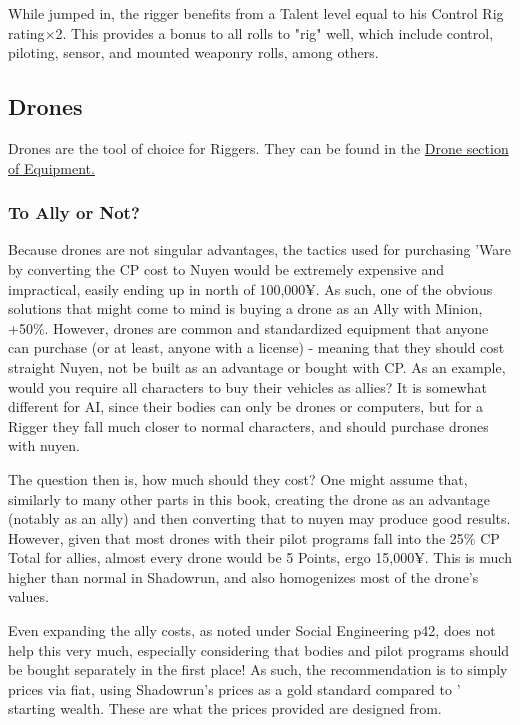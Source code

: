 \begin{multicols*}{3}
	While jumped in, the rigger benefits from a Talent level equal to his Control Rig rating$\times$2. This provides a bonus to all rolls to "rig" well, which include control, piloting, sensor, and mounted weaponry rolls, among others.
	
	\subsection{Drones}
	
	Drones are the tool of choice for Riggers. They can be found in the \hyperref[drones]{Drone section of Equipment.}
	
	\subsubsection{To Ally or Not?}
	
	Because drones are not singular advantages, the tactics used for purchasing 'Ware by converting the CP cost to Nuyen would be extremely expensive and impractical, easily ending up in north of 100,000¥. As such, one of the obvious solutions that might come to mind is buying a drone as an Ally with Minion, +50\%. However, drones are common and standardized equipment that anyone can purchase (or at least, anyone with a license) - meaning that they should cost straight Nuyen, not be built as an advantage or bought with CP. As an example, would you require all characters to buy their vehicles as allies? It is somewhat different for AI, since their bodies can only be drones or computers, but for a Rigger they fall much closer to normal characters, and should purchase drones with nuyen.
	
	The question then is, how much should they cost? One might assume that, similarly to many other parts in this book, creating the drone as an advantage (notably as an ally) and then converting that to nuyen may produce good results. However, given that most drones with their pilot programs fall into the 25\% CP Total for allies, almost every drone would be 5 Points, ergo 15,000¥. This is much higher than normal in Shadowrun, and also homogenizes most of the drone's values.
	
	Even expanding the ally costs, as noted under \GURPS Social Engineering p42, does not help this very much, especially considering that bodies and pilot programs should be bought separately in the first place! As such, the recommendation is to simply prices via fiat, using Shadowrun's prices as a gold standard compared to \GURPS' starting wealth. These are what the prices provided are designed from.
	

\end{multicols*}

